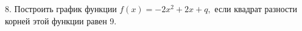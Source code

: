 8. Построить график функции $f(x)=-2x^2+2x+q,$ если квадрат разности корней этой функции равен 9.\\
